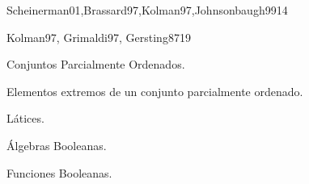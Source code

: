\begin{sumilla}
\begin{unit}{\DSTRESDef}{Scheinerman01,Brassard97,Kolman97,Johnsonbaugh99}{14}
\begin{topicos}
      \item \DSTRESTopicNociones
      \item \DSTRESTopicEstructura
      \item \DSTRESTopicPruebas
      \item \DSTRESTopicPruebasy
      \item \DSTRESTopicPruebaspor
      \item \DSTRESTopicPruebasporcontradiccion
      \item \DSTRESTopicInduccion
      \item \DSTRESTopicInduccionfuerte
      \item \DSTRESTopicDefiniciones
      \item \DSTRESTopicEl
   \end{topicos}

   \begin{objetivos}
      \item \DSTRESObjUNO
      \item \DSTRESObjDOS
      \item \DSTRESObjTRES
      \item \DSTRESObjCUATRO
   \end{objetivos}
\end{unit}

\begin{unit}{\ARUNODef}{Kolman97, Grimaldi97, Gersting87}{19}
\begin{topicos}
      \item Conjuntos Parcialmente Ordenados.
      \item Elementos extremos de un conjunto parcialmente ordenado.
      \item L\'atices.
      \item \'Algebras Booleanas.
      \item Funciones Booleanas.
      \item \ARUNOTopicExpresiones
      \item \ARUNOTopicBloques
   \end{topicos}
   \begin{objetivos}
      \item \DSTRESObjUNO
      \item \DSTRESObjDOS
      \item \DSTRESObjTRES
   \end{objetivos}
\end{unit}


\end{sumilla}

